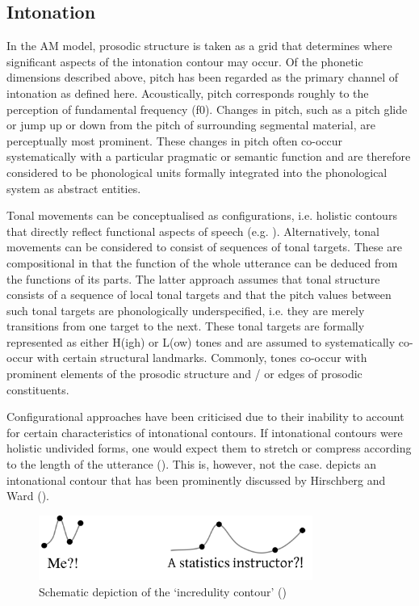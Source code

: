 \subsection{Intonation}
In the AM model, prosodic structure is taken as a grid that determines where significant aspects of the intonation contour may occur. Of the phonetic dimensions described above, pitch has been regarded as the primary channel of intonation as defined here. Acoustically, pitch corresponds roughly to the perception of fundamental frequency (f0). Changes in pitch, such as a pitch glide or jump up or down from the pitch of surrounding segmental material, are perceptually most prominent. These changes in pitch often co-occur systematically with a particular pragmatic or semantic function and are therefore considered to be phonological units formally integrated into the phonological system as abstract entities.

Tonal movements can be conceptualised as configurations, i.e. holistic contours that directly reflect functional aspects of speech (e.g. \citealt{Bolinger1951,Crystal1969,Halliday1967,OConnorArnold1973,Kohler1991,HirstDiCristo1998,Xu2005}). Alternatively, tonal movements can be considered to consist of sequences of tonal targets. These are compositional in that the function of the whole utterance can be deduced from the functions of its parts. The latter approach assumes that tonal structure consists of a sequence of local tonal targets and that the pitch values between such tonal targets are phonologically underspecified, i.e. they are merely transitions from one target to the next. These tonal targets are formally represented as either H(igh) or L(ow) tones and are assumed to systematically co-occur with certain structural landmarks. Commonly, tones co-occur with prominent elements of the prosodic structure and / or edges of prosodic constituents.

Configurational approaches have been criticised due to their inability to account for certain characteristics of intonational contours. If intonational contours were holistic undivided forms, one would expect them to stretch or compress according to the length of the utterance (\citealt{Arvaniti2011}). This is, however, not the case.  depicts an intonational contour that has been prominently discussed by Hirschberg and Ward (\citealt{WardHirsch1985,HirschbergWard1992}). 

\begin{figure}
  \centering 
   \includegraphics[width=0.8\textwidth]{figures/Figure_2_3.png}
  \caption{Schematic depiction of the ‘incredulity contour’ (\citealt{HirschbergWard1992,Ladd2008,Arvaniti2011})}
   \label{fig:2.3}
   \end{figure}
   
